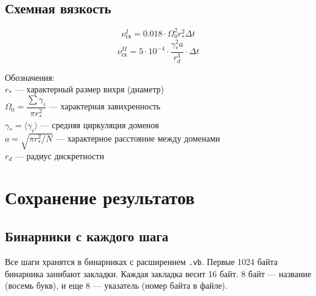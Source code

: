 \documentclass[a4paper,14pt]{extreport}
\begin{document}
\subsection{Схемная вязкость}
\begin{equation*}
\nu_\text{сх}^I = 0.018 \cdot \Omega_0^2 r_*^2 \Delta t
\end{equation*}
\begin{equation*}
\nu_\text{сх}^{II} = 5\cdot10^{-4} \cdot \dfrac{\gamma_*^2 a}{r_d^3} \cdot \Delta t
\end{equation*}

Обозначения:\\
$r_*$ --- характерный размер вихря (диаметр)\\
$\Omega_0 = \dfrac{\sum\gamma_i}{\pi r_*^2}$ --- характерная завихренность\\
$\gamma_* = \langle \gamma_i \rangle$ --- средняя циркуляция доменов\\
$a = \sqrt{\pi r_*^2 / N} $ --- характерное расстояние между доменами\\
$r_d$ --- радиус дискретности\\

\newpage
\section{Сохранение результатов}

\subsection{Бинарники с каждого шага}
Все шаги хранятся в бинарниках с расширением \texttt{.vb}.
Первые 1024 байта бинарника занибают закладки.
Каждая закладка весит 16 байт.
8 байт --- название (восемь букв), и еще 8 --- указатель (номер байта в файле).
\end{document}
